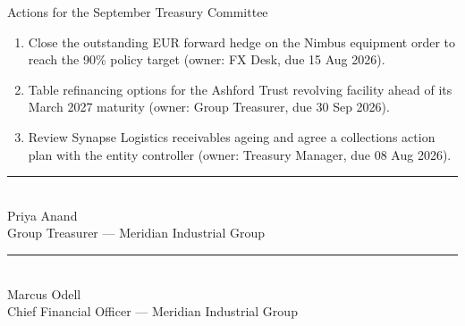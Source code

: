 \documentclass[11pt,a4paper]{scrreprt}
\begin{document}
\begin{policybox}{Actions for the September Treasury Committee}
\begin{enumerate}[leftmargin=1.4em,label=\arabic*.,itemsep=3pt]
  \item Close the outstanding EUR forward hedge on the Nimbus equipment order to reach
        the 90\% policy target (owner: FX Desk, due 15 Aug 2026).
  \item Table refinancing options for the Ashford Trust revolving facility ahead of its
        March 2027 maturity (owner: Group Treasurer, due 30 Sep 2026).
  \item Review Synapse Logistics receivables ageing and agree a collections action plan
        with the entity controller (owner: Treasury Manager, due 08 Aug 2026).
\end{enumerate}
\end{policybox}

\vspace{1.0cm}
\begin{minipage}{0.46\textwidth}
\textcolor{treasurymuted}{\rule{\linewidth}{0.4pt}}\\[2pt]
Priya Anand\\
{\small\color{treasurymuted}Group Treasurer --- Meridian Industrial Group}
\end{minipage}\hfill
\begin{minipage}{0.46\textwidth}
\textcolor{treasurymuted}{\rule{\linewidth}{0.4pt}}\\[2pt]
Marcus Odell\\
{\small\color{treasurymuted}Chief Financial Officer --- Meridian Industrial Group}
\end{minipage}
\end{document}
